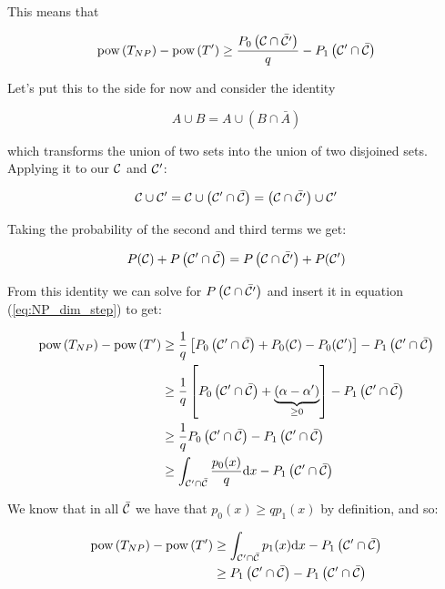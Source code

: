 This means that 

	\begin{equation}
	\text{pow}\left(T_{NP}\right) - \text{pow}\left(T^\prime\right) \geq \frac{P_0\left(\mathcal{C}\cap\bar{\mathcal{C}^\prime}\right)}{q} - P_1\left(\mathcal{C}^\prime\cap\bar{\mathcal{C}}\right)
	\label{eq:NP_dim_step}
	\end{equation}
	
Let's put this to the side for now and consider the identity

	\[
	A \cup B = A \cup \left(B \cap \bar{A} \right)
	\]

which transforms the union of two sets into the union of two disjoined sets. Applying it to our $\mathcal{C}$ and $\mathcal{C}^\prime$:

	\[
	\mathcal{C} \cup \mathcal{C}^\prime = \mathcal{C} \cup \left(\mathcal{C}^\prime \cap \bar{\mathcal{C}}\right) = \left(\mathcal{C} \cap \bar{\mathcal{C}^\prime}\right) \cup \mathcal{C}^\prime
	\]
	
Taking the probability of the second and third terms we get:

	\[
	P(\mathcal{C}) + P\left(\mathcal{C}^\prime \cap \bar{\mathcal{C}}\right) = P\left(\mathcal{C} \cap \bar{\mathcal{C}^\prime}\right) + P(\mathcal{C}^\prime)
	\]
	
From this identity we can solve for $P\left(\mathcal{C} \cap \bar{\mathcal{C}^\prime}\right)$ and insert it in equation (\ref{eq:NP_dim_step}) to get:

\begin{align*}
	\text{pow}\left(T_{NP}\right) - \text{pow}\left(T^\prime\right) &\geq \frac{1}{q}\left[P_0\left(\mathcal{C}^\prime \cap \bar{\mathcal{C}}\right) + P_0(\mathcal{C}) -P_0(\mathcal{C}^\prime)\right] - P_1\left(\mathcal{C}^\prime\cap\bar{\mathcal{C}}\right)\\
	&\geq \frac{1}{q}\left[P_0\left(\mathcal{C}^\prime \cap \bar{\mathcal{C}}\right) + \underbrace{\left(\alpha-\alpha^\prime\right)}_{\geq 0}\right] - P_1\left(\mathcal{C}^\prime\cap\bar{\mathcal{C}}\right)\\
	&\geq \frac{1}{q} P_0\left(\mathcal{C}^\prime \cap \bar{\mathcal{C}}\right)- P_1\left(\mathcal{C}^\prime\cap\bar{\mathcal{C}}\right)\\
	&\geq \int_{\mathcal{C}^\prime\cap\bar{\mathcal{C}}} \frac{p_0(x)}{q}\mathrm{d} x - P_1\left(\mathcal{C}^\prime\cap\bar{\mathcal{C}}\right)
\end{align*}

We know that in all $\bar{\mathcal{C}}$ we have that  $p_0(x) \geq qp_1(x)$ by definition, and so:

\begin{align*}
	\text{pow}\left(T_{NP}\right) - \text{pow}\left(T^\prime\right) &\geq \int_{\mathcal{C}^\prime\cap\bar{\mathcal{C}}} p_1(x) \mathrm{d} x - P_1\left(\mathcal{C}^\prime\cap\bar{\mathcal{C}}\right)\\
	&\geq P_1\left(\mathcal{C}^\prime\cap\bar{\mathcal{C}}\right) - P_1\left(\mathcal{C}^\prime\cap\bar{\mathcal{C}}\right)\\
\end{align*}

